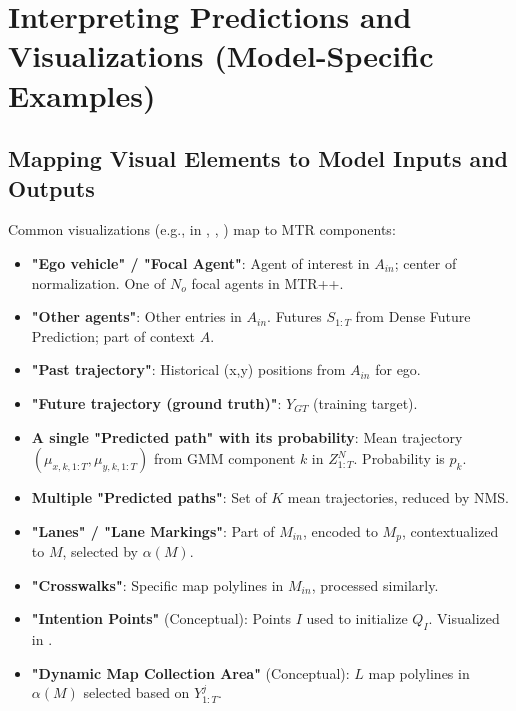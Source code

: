 \section{Interpreting Predictions and Visualizations (Model-Specific Examples)}
\label{sec:interpreting_visualizations}

\subsection{Mapping Visual Elements to Model Inputs and Outputs}
\label{subsec:mapping_visual_elements}

Common visualizations (e.g., in \cite{Shi2022MTR}, \cite{Shi2022MTR_A}, \cite{Shi2023MTRplusplus}) map to MTR components:

\begin{itemize}
    \item \textbf{"Ego vehicle" / "Focal Agent"}: Agent of interest in $A_{in}$; center of normalization. One of $N_o$ focal agents in MTR++.
    \item \textbf{"Other agents"}: Other entries in $A_{in}$. Futures $S_{1:T}$ from Dense Future Prediction; part of context $A$.
    \item \textbf{"Past trajectory"}: Historical (x,y) positions from $A_{in}$ for ego.
    \item \textbf{"Future trajectory (ground truth)"}: $Y_{GT}$ (training target).
    \item \textbf{A single "Predicted path" with its probability}: Mean trajectory $(\mu_{x,k,1:T}, \mu_{y,k,1:T})$ from GMM component $k$ in $Z_{1:T}^N$. Probability is $p_k$.
    \item \textbf{Multiple "Predicted paths"}: Set of $K$ mean trajectories, reduced by NMS.
    \item \textbf{"Lanes" / "Lane Markings"}: Part of $M_{in}$, encoded to $M_p$, contextualized to $M$, selected by $\alpha(M)$.
    \item \textbf{"Crosswalks"}: Specific map polylines in $M_{in}$, processed similarly.
    \item \textbf{"Intention Points"} (Conceptual): Points $I$ used to initialize $Q_I$. Visualized in \cite{Shi2022MTR}.
    \item \textbf{"Dynamic Map Collection Area"} (Conceptual): $L$ map polylines in $\alpha(M)$ selected based on $Y_{1:T}^j$.
\end{itemize}


